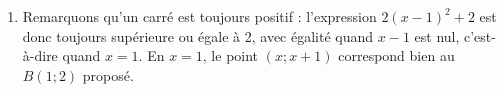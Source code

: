 {\begin{enumerate}
\begin{align*}
			\end{align*}
		D'autre part, en développant $2(x-1)^2 + 2$, on obtient
			\begin{align*}
				2(x-1)^2 + 2 &= 2(x-1)(x-1) + 2,
							\\ &= 2[x^2 - x - x + 1] + 2,
							\\ &= 2x^2 - 4x + 2 + 2,
							\\ &= 2x^2 - 4x + 4,
			\end{align*}
		ce qui montre l'identité recherchée.
		\item
		Remarquons qu'un carré est toujours positif : l'expression $2(x-1)^2 + 2$ est donc toujours supérieure ou égale à 2, avec égalité quand $x-1$ est nul, c'est-à-dire quand $x=1$.
		En $x=1$, le point $(x ; x+1)$ correspond bien au $B(1 ; 2)$ proposé.
	\end{enumerate}
}

\newpage



